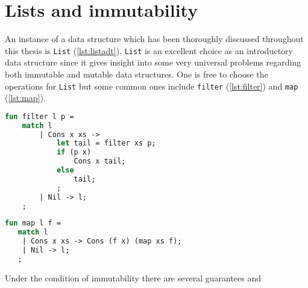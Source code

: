 
\section{Lists and immutability}
An instance of a data structure which has been thoroughly discussed throughout this thesis is \texttt{List} (\autoref{lst:listadt}).
\texttt{List} is an excellent choice as an introductory data structure since it gives insight into some very universal problems regarding both immutable and mutable data structures.
One is free to choose the operations for \texttt{List} but some common ones include \texttt{filter} (\autoref{lst:filter}) and \texttt{map} (\autoref{lst:map}).
\begin{lstlisting}[language=ML,caption={Filtering some \texttt{l:List a} based on a predicate p},label={lst:filter},mathescape=true]
fun filter l p = 
    match l
        | Cons x xs -> 
            let tail = filter xs p;
            if (p x)
                Cons x tail;
            else
                tail;
            ;
        | Nil -> l;
    ;
\end{lstlisting}
\begin{lstlisting}[language=ML,caption={Mapping from \texttt{List a} to \texttt{List b}},label={lst:map},mathescape=true]
fun map l f = 
   match l
    | Cons x xs -> Cons (f x) (map xs f);
    | Nil -> l;
   ;
\end{lstlisting}
Under the condition of immutability there are several guarantees and 
